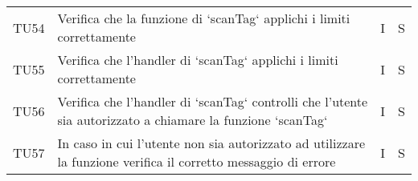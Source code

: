 \begin{center}
\begin{longtable}[!h]{p{45px} p{255px} p{35px} p{35px}}
        TU54          & Verifica che la funzione di `scanTag` applichi i limiti correttamente                                                                                                                            & I              & S              \\
        TU55          & Verifica che l'handler di `scanTag` applichi i limiti correttamente                                                                                                                              & I              & S              \\
        TU56          & Verifica che l'handler di `scanTag` controlli che l'utente sia autorizzato a chiamare la funzione `scanTag`                                                                                  & I              & S              \\
        TU57 & In caso in cui l'utente non sia autorizzato ad utilizzare la funzione verifica il corretto messaggio di errore & I & S \\

    \end{longtable}
\end{center}

